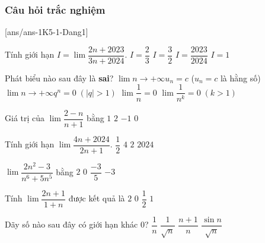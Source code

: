 \subsubsection{Câu hỏi trắc nghiệm}
[ans/ans-1K5-1-Dang1]
\begin{ex}%
	Tính giới hạn $I=\lim\dfrac{2n+2023}{3n+2024}$. 
	\choice
	{\True $I=\dfrac{2}{3}$}
	{$I=\dfrac{3}{2}$}
	{$I=\dfrac{2023}{2024}$}
	{$I=1$}
\end{ex}
\begin{ex}%
	Phát biểu nào sau đây là \textbf{sai}?
	\choice
	{$\lim \limits{n \to +\infty}u_n=c$ ($u_n=c$ là hằng số)}
	{\True $\lim \limits{n \to +\infty}q^n=0 \;(|q|>1)$}
	{$\lim\dfrac{1}{n}=0$}
	{$\lim\dfrac{1}{n^k}=0 \; (k>1)$}
\end{ex}
\begin{ex}%
	Giá trị của $\lim\dfrac{2-n}{n+1}$ bằng
	\choice
	{$1$}
	{$2$}
	{\True $-1$}
	{$0$}
\end{ex}
\begin{ex}%
	Tính giới hạn $\lim\dfrac{4n+2024}{2n+1}$. 
	\choice
	{$\dfrac{1}{2}$}
	{$4$}
	{\True $2$}
	{$2024$}
\end{ex}
\begin{ex}%
	$\lim\dfrac{2n^2-3}{n^6+5n^5}$ bằng 
	\choice
	{$2$}
	{\True $0$}
	{$\dfrac{-3}{5}$}
	{$-3$}
\end{ex}
\begin{ex}%
	Tính $\lim\dfrac{2n+1}{1+n}$ được kết quả là
	\choice
	{\True $2$}
	{$0$}
	{$\dfrac{1}{2}$}
	{$1$}
\end{ex}

\begin{ex}%
	Dãy số nào sau đây có giới hạn khác $0$?
	\choice
	{$\dfrac{1}{n}$}
	{$\dfrac{1}{\sqrt{n}}$}
	{\True $\dfrac{n+1}{n}$}
	{$\dfrac{\sin n}{\sqrt{n}}$}
\end{ex}

